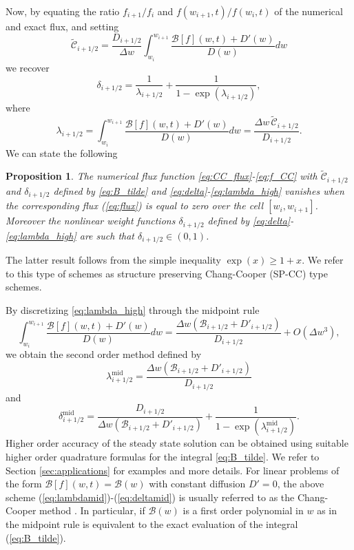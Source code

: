 \documentclass[a4paper]{article}
\newtheorem{proposition}{Proposition}
\theoremstyle{remark}\newtheorem{remark}{Remark}
\newcommand{\B}{\mathcal{B}}
\newcommand{\C}{\mathcal{C}}
\newcommand{\be}{\begin{equation}}
\newcommand{\ee}{\end{equation}}
\begin{document}
Now, by equating the ratio $f_{i+1}/f_i$ and $f(w_{i+1},t)/f(w_i,t)$ of the numerical and exact flux, and setting
\be\label{eq:B_tilde}
\tilde{\C}_{i+1/2}=\dfrac{D_{i+1/2}}{\Delta w}\int_{w_i}^{w_{i+1}}\dfrac{\B[f](w,t)+D'(w)}{D(w)}dw
\ee
we recover
\be\label{eq:delta}
\delta_{i+1/2} = \dfrac{1}{\lambda_{i+1/2}}+\dfrac{1}{1-\exp(\lambda_{i+1/2})}, 
\ee
where
\be\label{eq:lambda_high}
\lambda_{i+1/2}=\int_{w_i}^{w_{i+1}}\dfrac{\B[f](w,t)+D'(w)}{D(w)}dw=\frac{\Delta w\,\tilde{\C}_{i+1/2}}{D_{i+1/2}}.
\ee
We can state the following 
\begin{proposition}
The numerical flux function \eqref{eq:CC_flux}-\eqref{eq:f_CC} with $\tilde{\C}_{i+1/2}$ and $\delta_{i+1/2}$ defined by \eqref{eq:B_tilde} and \eqref{eq:delta}-\eqref{eq:lambda_high} vanishes when the corresponding flux (\ref{eq:flux}) is equal to zero over the cell $[w_i,w_{i+1}]$. Moreover the nonlinear weight functions $\delta_{i+1/2}$ defined by \eqref{eq:delta}-\eqref{eq:lambda_high} are such that $\delta_{i+1/2} \in (0,1)$.  
\end{proposition}

The latter result follows from the simple inequality $\exp(x) \geq 1 + x$. We refer to this type of schemes as structure preserving Chang-Cooper (SP-CC) type schemes.

By discretizing \eqref{eq:lambda_high} through the midpoint rule 
\[
\int_{w_i}^{w_{i+1}}\dfrac{\B[f](w,t)+D'(w)}{D(w)}dw = \dfrac{\Delta w(\B_{i+1/2}+D'_{i+1/2})}{D_{i+1/2}}+O(\Delta w^3),
\]
we obtain the second order method defined by 
\be\label{eq:lambdamid}
\lambda_{i+1/2}^{\textrm{mid}} = \dfrac{\Delta w(\B_{i+1/2}+ D'_{i+1/2})}{D_{i+1/2}}
\ee
and 
\be
\label{eq:deltamid}
\delta_{i+1/2}^{\textrm{mid}} = \dfrac{D_{i+1/2}}{\Delta w(\B_{i+1/2}+ D'_{i+1/2})}+\dfrac{1}{1-\exp(\lambda_{i+1/2}^{\textrm{mid}})}.
\ee
Higher order accuracy of the steady state solution can be obtained using suitable higher order quadrature formulas for the integral \eqref{eq:B_tilde}. We refer to Section \ref{sec:applications} for examples and more details. For linear problems of the form $\B[f](w,t)=\B(w)$ with constant diffusion $D'=0$, the above scheme (\ref{eq:lambdamid})-(\ref{eq:deltamid}) is usually referred to as the Chang-Cooper method \cite{ChCo,MB}. In particular, if $\B(w)$ is a first order polynomial in $w$ as in \cite{BuetDellacherie2010} the midpoint rule is equivalent to the exact evaluation of the integral (\ref{eq:B_tilde}).
\end{document}
